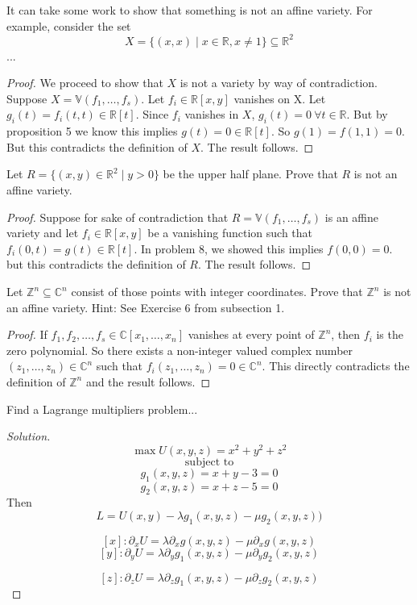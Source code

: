 \documentclass{article}
\newenvironment{problem}[2][Problem]{\begin{trivlist}
\item[\hskip \labelsep {\bfseries #1}\hskip \labelsep {\bfseries #2.}]}{\end{trivlist}}
\newenvironment{solution}{\begin{proof}[Solution]}{\end{proof}}
\begin{document}
\begin{problem}{(8)}
It can take some work to show that something is not an affine variety. For example, consider the set
$$X = \{(x, x) \mid x \in \mathbb{R}, x \neq 1\}\subseteq\mathbb{R}^2$$...
\end{problem}
\begin{proof}
We proceed to show that $X$ is not a variety by way of contradiction. \newline
Suppose $X = \mathbb{V}(f_1,\dots,f_s)$. Let $f_i\in \mathbb{R}[x,y]$ vanishes on X.  Let $g_i(t) = f_i(t,t) \in \mathbb{R}[t]$. Since $f_i$ vanishes in $X$, $g_i(t) = 0 \ \forall t \in \mathbb{R}$.  But by proposition 5 we know this implies $g(t) = 0  \in \mathbb{R}[t]$. So $g(1) = f(1,1) = 0$. But this contradicts the definition of $X$.  The result follows.
\end{proof}
\begin{problem}{(9)}
Let $R=\{(x,y)\in\mathbb{R}^2 \mid y>0\}$ be the upper half plane. Prove that $R$ is not an affine variety.
\end{problem}
\begin{proof}
Suppose for sake of contradiction that $R =\mathbb{V}(f_1,\dots,f_s)$ is an affine variety and let $f_i \in \mathbb{R}[x,y]$ be a vanishing function such that $f_i(0,t) = g(t) \in \mathbb{R}[t]$. In problem 8, we showed this implies $f(0,0)=0.$ but this contradicts the definition of $R$. The result follows.
\end{proof}
\begin{problem}{(10)}
Let $\mathbb{Z}^n \subseteq \mathbb{C}^n$ consist of those points with integer coordinates. Prove that $\mathbb{Z}^n$ is not an affine variety. Hint: See Exercise 6 from subsection 1.
\end{problem}
\begin{proof}
If $f_1,f_2,\dots,f_s \in \mathbb{C}[x_1, \dots , x_n]$ vanishes at every point of $\mathbb{Z}^n$, then $f_i$ is the zero polynomial. So there exists a non-integer valued complex number $(z_1,\dots,z_n) \in \mathbb{C}^n$ such that $f_i(z_1,\dots,z_n) = 0 \in \mathbb{C}^n$. This directly contradicts the definition of $\mathbb{Z}^n$ and the result follows.
\end{proof}
\begin{problem}{(12)}
Find a Lagrange multipliers problem...
\end{problem}
\begin{solution}
$$\max U(x,y,z) = x^2 + y^2 + z^2$$
$$\text{subject to}$$
$$g_1(x,y,z) = x+ y -3 = 0$$ $$g_2(x,y,z) = x+ z -5 = 0$$
Then
$$L = U(x,y) - \lambda g_1(x,y,z) -\mu g_2(x,y,z)) $$

$$[x]: \partial_x U = \lambda \partial_x g(x,y,z) - \mu \partial_x g(x,y,z)$$
$$[y]: \partial_y U = \lambda \partial_y g_1(x,y,z) - \mu \partial_y g_2(x,y,z)$$

$$[z]: \partial_z U = \lambda \partial_z g_1(x,y,z) - \mu \partial_z g_2(x,y,z)$$
\end{solution}
\end{document}
